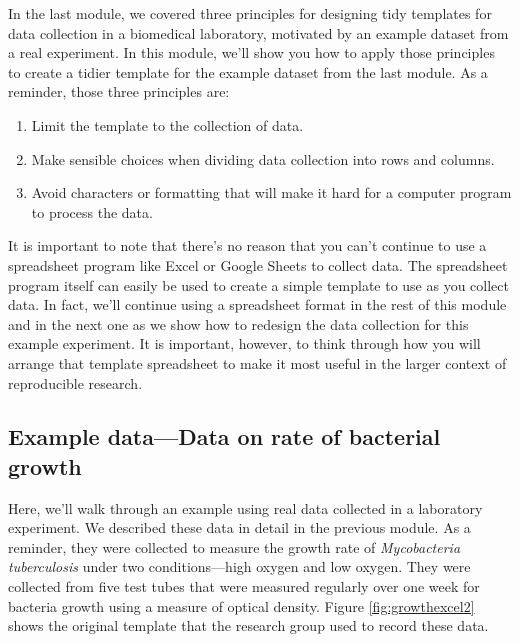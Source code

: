 \documentclass[]{tufte-book}
\providecommand{\tightlist}{%
  \setlength{\itemsep}{0pt}\setlength{\parskip}{0pt}}
\begin{document}
In the last module, we covered three principles for designing tidy templates for
data collection in a biomedical laboratory, motivated by an example dataset from
a real experiment. In this module, we'll show you how to apply those principles
to create a tidier template for the example dataset from the last module.
As a reminder, those three principles are:

\begin{enumerate}
\def\labelenumi{\arabic{enumi}.}
\tightlist
\item
  Limit the template to the collection of data.
\item
  Make sensible choices when dividing data collection into rows and columns.
\item
  Avoid characters or formatting that will make it hard for a computer program to process the data.
\end{enumerate}

It is important to note that there's no reason that you can't continue to use a
spreadsheet program like Excel or Google Sheets to collect data. The spreadsheet
program itself can easily be used to create a simple template to use as you
collect data. In fact, we'll continue using a spreadsheet format in the rest of
this module and in the next one as we show how to redesign the data collection
for this example experiment. It is important, however, to think through how you
will arrange that template spreadsheet to make it most useful in the larger
context of reproducible research.

\hypertarget{example-datadata-on-rate-of-bacterial-growth}{%
\subsection{Example data---Data on rate of bacterial growth}\label{example-datadata-on-rate-of-bacterial-growth}}

Here, we'll walk through an example using real data collected in a laboratory
experiment. We described these data in detail in the previous module. As a
reminder, they were collected to measure the growth rate of \emph{Mycobacteria
tuberculosis} under two conditions---high oxygen and low oxygen. They were
collected from five test tubes that were measured regularly over one week for
bacteria growth using a measure of optical density. Figure
\ref{fig:growthexcel2} shows the original template that the research group used
to record these data.
\end{document}
